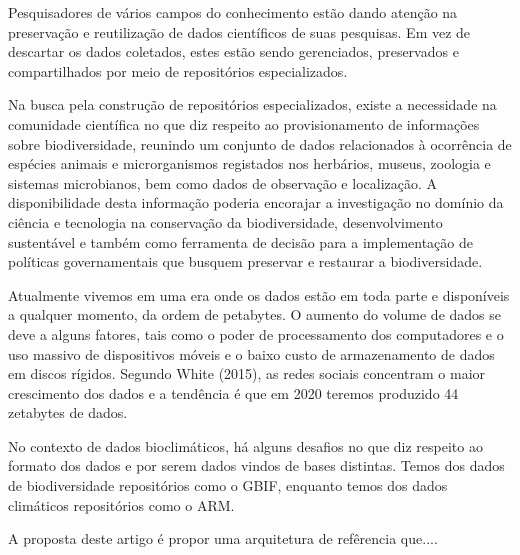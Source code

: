 \documentclass[conference]{IEEEtran}
\begin{document}
Pesquisadores de v\'{a}rios campos do conhecimento est\~{a}o dando aten\c{c}\~{a}o na  preserva\c{c}\~{a}o e reutiliza\c{c}\~{a}o de dados cient\'{i}ficos de suas pesquisas. Em vez de descartar os dados coletados, estes est\~{a}o sendo gerenciados, preservados e compartilhados por meio de reposit\'{o}rios especializados\cite{Fu:2017}.

Na busca pela constru\c{c}\~{a}o de reposit\'{o}rios especializados, existe a necessidade na comunidade cient\'{i}fica no que diz respeito ao provisionamento de informa\c{c}\~{o}es sobre biodiversidade, reunindo um conjunto de dados relacionados \`{a} ocorr\^{e}ncia de esp\'{e}cies animais e microrganismos registados nos herb\'{a}rios, museus, zoologia e sistemas microbianos, bem como dados de observa\c{c}\~{a}o e localiza\c{c}\~{a}o. A disponibilidade desta informa\c{c}\~{a}o poderia encorajar a investiga\c{c}\~{a}o no dom\'{i}nio da ci\^{e}ncia e tecnologia  na conserva\c{c}\~{a}o da biodiversidade, desenvolvimento sustent\'{a}vel e tamb\'{e}m como ferramenta de decis\~{a}o para a implementa\c{c}\~{a}o de pol\'{i}ticas governamentais que busquem preservar e restaurar a biodiversidade\cite{Peterson:2015}.

Atualmente vivemos em uma era onde os dados est\~{a}o em toda parte e dispon\'{i}veis a qualquer momento, da ordem de petabytes\cite{White:2015}. O aumento do volume de dados se deve a alguns fatores, tais como o poder de processamento dos computadores e o uso massivo de dispositivos m\'{o}veis e o baixo custo de armazenamento de dados em discos r\'{i}gidos\cite{Marquesone:2014}. Segundo White (2015), as redes sociais concentram o maior crescimento dos dados e a tendência é que em 2020 teremos produzido 44 zetabytes de dados.

No contexto de dados bioclim\'{a}ticos, h\'{a} alguns desafios no que diz respeito ao formato dos dados e por serem dados vindos de bases distintas. Temos dos dados de biodiversidade reposit\'{o}rios como o GBIF\cite{Gbif}, enquanto temos dos dados clim\'{a}ticos reposit\'{o}rios como o ARM\cite{ArmProject}. 

A proposta deste artigo \'{e} propor uma arquitetura de ref\^{e}rencia que.... %
\end{document}
